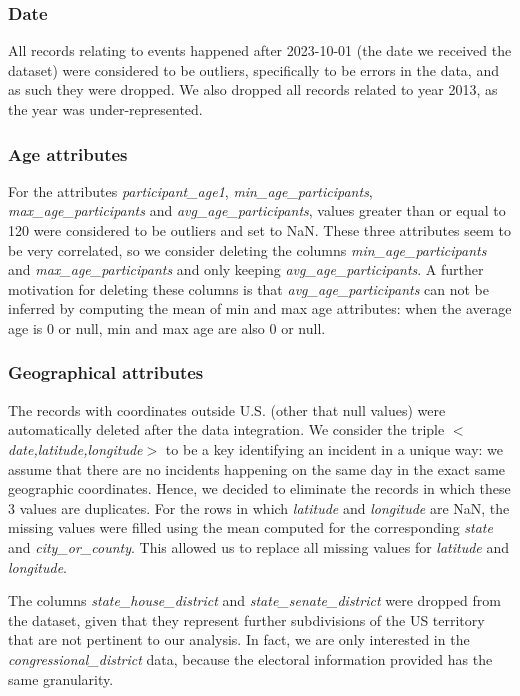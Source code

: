 \documentclass[10pt,a4paper]{report}
\begin{document}
\subsubsection{Date}

All records relating to events happened after 2023-10-01 (the date we received the dataset) were considered to be outliers, specifically to be errors in the data, and as such they were dropped.
We also dropped all records related to year 2013, as the year was under-represented.

\subsubsection{Age attributes}

For the attributes \textit{participant\_age1}, \textit{min\_age\_participants}, \textit{max\_age\_participants} and \textit{avg\_age\_participants}, values greater than or equal to 120 were considered to be outliers and set to NaN.
These three attributes seem to be very correlated, so we consider deleting the columns \textit{min\_age\_participants} and \textit{max\_age\_participants} and only keeping \textit{avg\_age\_participants}.
A further motivation for deleting these columns is that \textit{avg\_age\_participants} can not be inferred by computing the mean of min and max age attributes: when the average age is 0 or null, min and max age are also 0 or null.

\subsubsection{Geographical attributes}

The records with coordinates outside U.S. (other that null values) were automatically deleted after the data integration.
We consider the triple \textit{$<$date,latitude,longitude$>$} to be a key identifying an incident in a unique way: we assume that there are no incidents happening on the same day in the exact same geographic coordinates.
Hence, we decided to eliminate the records in which these 3 values are duplicates.
For the rows in which \textit{latitude} and \textit{longitude} are NaN, the missing values were filled using the mean computed for the corresponding \textit{state} and \textit{city\_or\_county}.
This allowed us to replace all missing values for \textit{latitude} and \textit{longitude}.

The columns \textit{state\_house\_district} and \textit{state\_senate\_district} were dropped from the dataset, given that they represent further subdivisions of the US territory that are not pertinent to our analysis.
In fact, we are only interested in the \textit{congressional\_district} data, because the electoral information provided has the same granularity.
\end{document}
